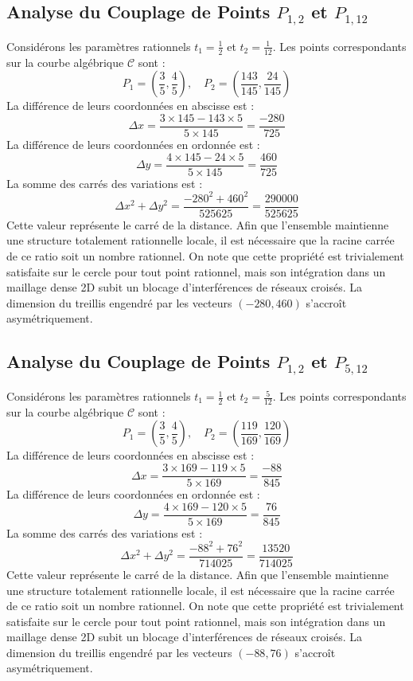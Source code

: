 \documentclass[12pt, a4paper]{article}
\begin{document}
\subsection{Analyse du Couplage de Points $P_{1,2}$ et $P_{1,12}$}
Considérons les paramètres rationnels $t_1 = \frac{1}{2}$ et $t_2 = \frac{1}{12}$.
Les points correspondants sur la courbe algébrique $\mathcal{C}$ sont :
$$ P_1 = \left( \frac{3}{5}, \frac{4}{5} \right), \quad P_2 = \left( \frac{143}{145}, \frac{24}{145} \right) $$
La différence de leurs coordonnées en abscisse est :
$$ \Delta x = \frac{3 \times 145 - 143 \times 5}{5 \times 145} = \frac{-280}{725} $$
La différence de leurs coordonnées en ordonnée est :
$$ \Delta y = \frac{4 \times 145 - 24 \times 5}{5 \times 145} = \frac{460}{725} $$
La somme des carrés des variations est :
$$ \Delta x^2 + \Delta y^2 = \frac{ -280^2 + 460^2 }{ 525625 } = \frac{ 290000 }{ 525625 } $$
Cette valeur représente le carré de la distance. Afin que l'ensemble maintienne une structure totalement rationnelle locale, il est nécessaire que la racine carrée de ce ratio soit un nombre rationnel. On note que cette propriété est trivialement satisfaite sur le cercle pour tout point rationnel, mais son intégration dans un maillage dense 2D subit un blocage d'interférences de réseaux croisés. La dimension du treillis engendré par les vecteurs $( -280, 460 )$ s'accroît asymétriquement.


\subsection{Analyse du Couplage de Points $P_{1,2}$ et $P_{5,12}$}
Considérons les paramètres rationnels $t_1 = \frac{1}{2}$ et $t_2 = \frac{5}{12}$.
Les points correspondants sur la courbe algébrique $\mathcal{C}$ sont :
$$ P_1 = \left( \frac{3}{5}, \frac{4}{5} \right), \quad P_2 = \left( \frac{119}{169}, \frac{120}{169} \right) $$
La différence de leurs coordonnées en abscisse est :
$$ \Delta x = \frac{3 \times 169 - 119 \times 5}{5 \times 169} = \frac{-88}{845} $$
La différence de leurs coordonnées en ordonnée est :
$$ \Delta y = \frac{4 \times 169 - 120 \times 5}{5 \times 169} = \frac{76}{845} $$
La somme des carrés des variations est :
$$ \Delta x^2 + \Delta y^2 = \frac{ -88^2 + 76^2 }{ 714025 } = \frac{ 13520 }{ 714025 } $$
Cette valeur représente le carré de la distance. Afin que l'ensemble maintienne une structure totalement rationnelle locale, il est nécessaire que la racine carrée de ce ratio soit un nombre rationnel. On note que cette propriété est trivialement satisfaite sur le cercle pour tout point rationnel, mais son intégration dans un maillage dense 2D subit un blocage d'interférences de réseaux croisés. La dimension du treillis engendré par les vecteurs $( -88, 76 )$ s'accroît asymétriquement.
\end{document}
